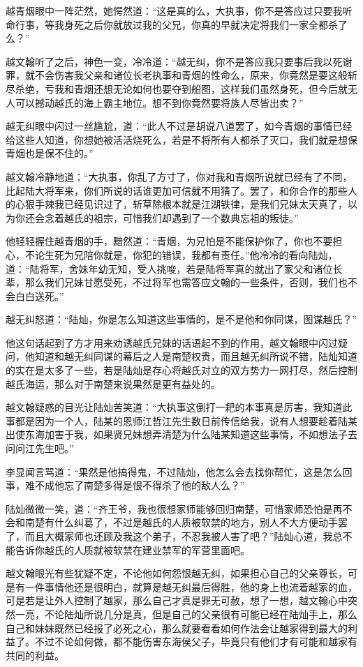 越青烟眼中一阵茫然，她愕然道：“这是真的么，大执事，你不是答应过只要我听命行事，等我身死之后你就放过我的父兄，你真的早就决定将我们一家全都杀了么？”

越文翰听了之后，神色一变，冷冷道：“越无纠，你不是答应我只要事后我以死谢罪，就不会伤害我父亲和诸位长老执事和青烟的性命么，原来，你竟然是要这般斩尽杀绝，亏我和青烟还想无论如何也要夺到船图，这样我们虽然身死，但今后就无人可以撼动越氏的海上霸主地位。想不到你竟然要将族人尽皆出卖？”

越无纠眼中闪过一丝尴尬，道：“此人不过是胡说八道罢了，如今青烟的事情已经给这些人知道，你想她被活活烧死么，若是不将所有人都杀了灭口，我们就是想保青烟也是保不住的。”

越文翰冷静地道：“大执事，你乱了方寸了，你对我和青烟所说就已经有了不同，比起陆大将军来，你们所说的话谁更加可信就不用猜了。罢了，和你合作的那些人的心狠手辣我已经见识过了，斩草除根本就是江湖铁律，是我们兄妹太天真了，以为你还会念着越氏的祖宗，可惜我们却遇到了一个数典忘祖的叛徒。”

他轻轻握住越青烟的手，黯然道：“青烟，为兄怕是不能保护你了，你也不要担心，不论生死为兄陪你就是，你犯的错误，我都有责任。”他冷冷的看向陆灿，道：“陆将军，舍妹年幼无知，受人挑唆，若是陆将军真的就出了家父和诸位长辈，那么我们兄妹甘愿受死，不过将军也需答应文翰的一些条件，否则，我们也不会白白送死。”

越无纠怒道：“陆灿，你是怎么知道这些事情的，是不是他和你同谋，图谋越氏？”

他这句话起到了方才用来劝诱越氏兄妹的话语起不到的作用，越文翰眼中闪过疑问，他知道和越无纠同谋的幕后之人是南楚权贵，而且越无纠所说不错，陆灿知道的实在是太多了一些，若是陆灿是存心将越氏对立的双方势力一网打尽，然后控制越氏海运，那么对于南楚来说果然是更有益处的。

越文翰疑惑的目光让陆灿苦笑道：“大执事这倒打一耙的本事真是厉害，我知道此事都是因为一个人，陆某的恩师江哲江先生数日前传信给我，说有人想要趁着陆某出使东海加害于我，如果贤兄妹想弄清楚为什么陆某知道这些事情，不如想法子去问问江先生吧。”

李显闻言骂道：“果然是他搞得鬼，不过陆灿，他怎么会去找你帮忙，这是怎么回事，难不成他忘了南楚多得是恨不得杀了他的敌人么？”

陆灿微微一笑，道：“齐王爷，我也很想家师能够回归南楚，可惜家师恐怕是再不会和南楚有什么纠葛了，不过是越氏的人质被软禁的地方，别人不大方便动手罢了，而且大概家师也还顾及我这个弟子，不忍我被人害了吧？”陆灿心道，我总不能告诉你越氏的人质就被软禁在建业禁军的军营里面吧。

越文翰眼光有些犹疑不定，不论他如何怨恨越无纠，如果担心自己的父亲尊长，可是有一件事情他还是很明白，就算是越无纠最后得胜，他的身上也流着越家的血，可是若是让外人控制了越家，那么自己才真是罪无可赦，想了一想，越文翰心中突然一亮，不论陆灿所说几分是真，但是自己的父亲很有可能已经在陆灿手上，那么自己和妹妹既然已经报了必死之心，那么就要看看如何作法会让越家得到最大的利益了。不过不论如何做，都不能伤害东海侯父子，毕竟只有他们才有可能和越家有共同的利益。

